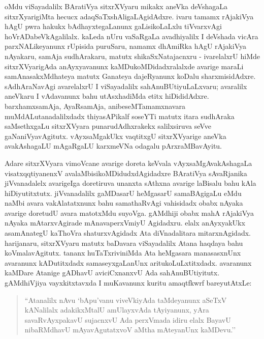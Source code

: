 oMdu viSayadalilx BAratiVya sitxrXVyaru mikakx aneVka deVshagaLa sitxrXyarigiMta hecucx adaqSaTxshAligaLAgidAdxre. ivaru tamamx rAjakiVya hAgU pwra hakukx bAdhayxtegaLanunx gaLisikoLaLxlu tiVvarxvAgi hoVrADabeVkAgalilalx. kaLeda nUru vaSaRgaLa avadhiyalilx I deVshada vicAra parxNALikeyanunx rUpisida puruSaru, namamx dhAmiRka hAgU rAjakiVya nAyakaru, samAja sudhArakaru, matutx shikaSxNatajacnxru - ivarelalxrU hiMde sitxrXVyarigAda anAyxyavanunx kaMDukoMDidadxralalxde avarige maraLi samAnasakxMdhateya matutx Ganateya dajeRyanunx koDalu sharxmisidAdxre. sAdhAraNavAgi avarelalxrU I viSayadalilx sahAnuBUtiyuLaLxvaru; avaralilx aneVkaru I vAdavanunx bahu utAsxhadiMda etitx hiDididAdxre. barxhamxsamAja, AyaRsamAja, anibeseMTamamxnavara muMdALutanadalilxdadx thiyasAPikalf soseYTi matutx itara sudhAraka saMsethxgaLu sitxrXVyara punarudAdhxrakekx salilxsiruva seVve gaNaniVyavAgitutx. vAyxsaMgakUkx vaqtitxgU sitxrXVyarige aneVka avakAshagaLU mAgaRgaLU karxmeVNa odagalu pArxraMBavAyitu.

Adare sitxrXVyara vimoVcane avarige doreta keVvala vAyxsaMgAvakAshagaLa visatxqqti\-yanenxV avalaMbisikoMDidudxdAgidadxre BAratiVya sAvaRjanika jiVvanadalelx avarige\break Iga doretiruva unanxta sAthxna avarige laBisalu bahu kAla hiDiyutitxtutx. jiVvana\-dalilx gaMDasarU heMgasarU samaBAgigaLu eMdu naMbi avara vakAlatatxnunx bahu samathaR\-vAgi vahisidadx obabx nAyaka avarige doretudU avara matotxMdu \hbox{suyoVga}. gAMdhiji obabx mahA rAjakiVya nAyaka mAtarxvAgirade mAnavaperxVmiyU Agidadxru. elalx anAyxyakUkx asamAnategU kaThoVra shaturxvAgidadx Ata diVnadalitara mitarxnAgidadx. harijanaru, sitxrXVyaru matutx baDavara viSayadalilx Atana haqdaya bahu koVmalavAgitutx. tananx huTaTxriviniMda Ata heMgasara manasasxnUnx avaranunx kADutitxdadx samaseyxgaLanUnx aritukoLuLxtitxdadx. avaranunx kaMDare Atanige gADhavU aviciCxnanxvU Ada sahAnuBUtiyitutx. gAMdhiVjiya vayxkitxtavxda I muKavanunx kuritu amaqtfkwrf bareyutAtxLe:

\begin{quote}
``Atanalilx nAvu `bApu'vanu viveVkiyAda taMdeyanunx aSeTxV kANalilalx adakikxMtalU amUlayxvAda tAyiyanunx, yAra savaR\-vAyxpakavU sujacnxvU Ada perxVmada idiru elalx BayavU nibaRMdhavU mAyavAgutatxvoV aMtha mAteyanUnx kaMDevu.''
\end{quote}

\eject

